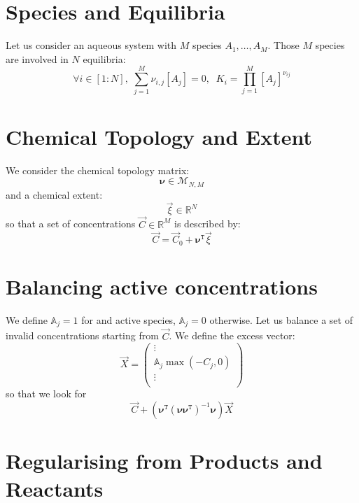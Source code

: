 \documentclass[aps,12pt]{revtex4}
\newcommand{\trn}[1]{{#1}^{\mathtt{T}}}
\newcommand{\conc}[1]{{\left[#1\right]}}
\begin{document}
\section{Species and Equilibria}
Let us consider an aqueous system with $M$ species $A_1,\ldots,A_M$.
Those $M$ species are involved in $N$ equilibria:
\begin{equation}
	\forall i\in[1:N], \; \sum_{j=1}^M \nu_{i,j} \conc{A_j} = 0,
	 \;\; K_i = \prod_{j=1}^M \conc{A_j}^{\nu_{ij}}
\end{equation}

\section{Chemical Topology and Extent}
We consider the chemical topology matrix:
\begin{equation}
	\bm{\nu} \in \mathcal{M}_{N,M}
\end{equation}
and a chemical extent:
\begin{equation}
	\vec{\xi} \in \mathbb{R}^{N}
\end{equation}
so that a set of concentrations $\vec{C}\in\mathbb{R}^M$ is described by:
\begin{equation}
	\vec{C} = \vec{C}_0 + \trn{\bm{\nu}} \vec{\xi}
\end{equation}


\section{Balancing active concentrations}
We define $\mathbb{A}_j=1$ for and active species, $\mathbb{A}_j=0$ otherwise.
Let us balance a set of invalid concentrations starting from $\vec{C}$.
We define the excess vector:
\begin{equation}
	\vec{X} = 
	\begin{pmatrix}
		\vdots\\
		\mathbb{A}_j \max(-C_j,0)\\
		\vdots\\
	\end{pmatrix}
\end{equation}
 so that we look for
\begin{equation}
	  \vec{C} + \left( \trn{\bm{\nu}} \left( \bm{\nu} \trn{\bm{\nu}}\right)^{-1} \bm{\nu}\right)   \vec{X}
\end{equation}


 \section{Regularising from Products and Reactants}
\end{document}
